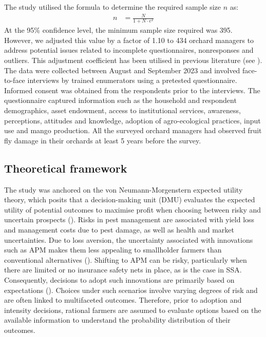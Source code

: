 \documentclass[fleqn,twoside,reqno]{article}
\begin{document}
The study utilised the \cite{Yamane1967} formula to determine the required sample size $n$ as:
\begin{align}
n &= \frac{N}{1 + N \cdot e^2}
\end{align}
At the 95\% confidence level, the minimum sample size required was 395. However, we adjusted this value by a factor of 1.10 to 434 orchard managers to address potential issues related to incomplete questionnaires, nonresponses and outliers. This adjustment coefficient has been utilised in previous literature (see \cite{Ojwang2021}). The data were collected between August and September 2023 and involved face-to-face interviews by trained enumerators using a pretested questionnaire. Informed consent was obtained from the respondents prior to the interviews. The questionnaire captured information such as the household and respondent demographics, asset endowment, access to institutional services, awareness, perceptions, attitudes and knowledge, adoption of agro-ecological practices, input use and mango production. All the surveyed orchard managers had observed fruit fly damage in their orchards at least 5 years before the survey.

\subsection{Theoretical framework}
The study was anchored on the von Neumann-Morgenstern expected utility theory, which posits that a decision-making unit (DMU) evaluates the expected utility of potential outcomes to maximise profit when choosing between risky and uncertain prospects (\cite{Neumann1944}). Risks in pest management are associated with yield loss and management costs due to pest damage, as well as health and market uncertainties. Due to loss aversion, the uncertainty associated with innovations such as APM makes them less appealing to smallholder farmers than conventional alternatives (\cite{Alwang2019}). Shifting to APM can be risky, particularly when there are limited or no insurance safety nets in place, as is the case in SSA. Consequently, decisions to adopt such innovations are primarily based on expectations (\cite{Feder1979}). Choices under such scenarios involve varying degrees of risk and are often linked to multifaceted outcomes. Therefore, prior to adoption and intensity decisions, rational farmers are assumed to evaluate options based on the available information to understand the probability distribution of their outcomes.
\end{document}
